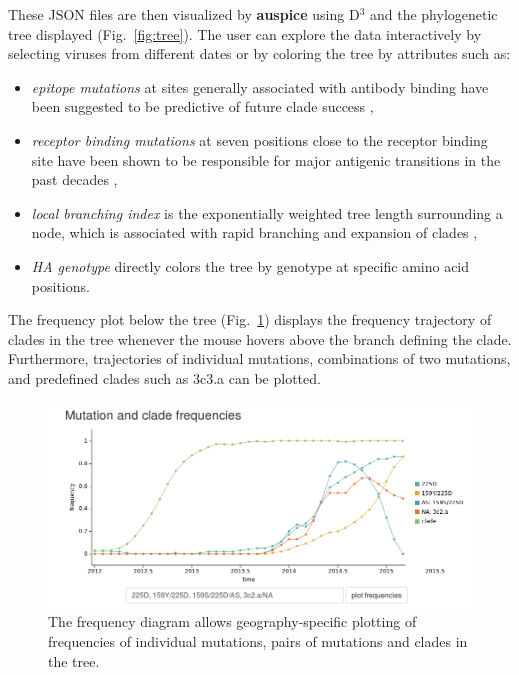 \documentclass{bioinfo}
\newcommand{\FIG}[1]{Fig.~\ref{fig:#1}}
\newcommand{\auspice}{\textbf{auspice}}
\begin{document}
These JSON files are then visualized by \auspice{} using D$^3$ \citep{bostock_d3_2011} and the phylogenetic tree displayed (\FIG{tree}).
The user can explore the data interactively by selecting viruses from different dates or by coloring the tree by attributes such as:
\begin{itemize}
	\item \textit{epitope mutations} at sites generally associated with antibody binding have been suggested to be predictive of future clade success \citep{luksza_predictive_2014},
    \item \textit{receptor binding mutations} at seven positions close to the receptor binding site have been shown to be responsible for major antigenic transitions in the past decades \citep{koel_substitutions_2013},
    \item \textit{local branching index} is the exponentially weighted tree length surrounding a node, which is associated with rapid branching and expansion of clades \citep{neher_predicting_2014},
    \item \textit{HA genotype} directly colors the tree by genotype at specific amino acid positions.
\end{itemize}

The frequency plot below the tree (\FIG{freq}) displays the frequency trajectory of clades in the tree whenever the mouse hovers above the branch defining the clade. 
Furthermore, trajectories of individual mutations, combinations of two mutations, and predefined clades such as 3c3.a can be plotted.

\begin{figure}[t]
	\begin{center}
	\includegraphics[width=0.99\columnwidth]{figures/frequencies}
\caption[]{The frequency diagram allows geography-specific plotting of frequencies of individual mutations, pairs of mutations and clades in the tree.}
\label{fig:freq}
\end{center}
\end{figure}
\end{document}
